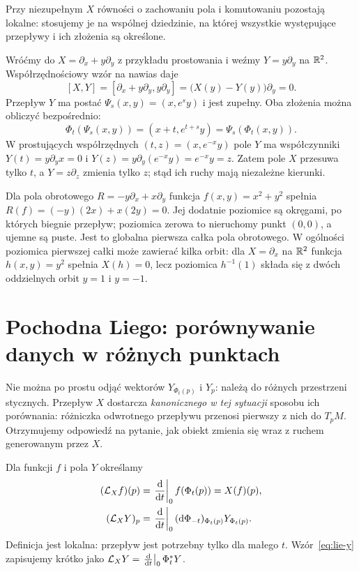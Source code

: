 Przy niezupełnym $X$ równości o zachowaniu pola i komutowaniu
pozostają lokalne: stosujemy je na wspólnej dziedzinie, na której
wszystkie występujące przepływy i ich złożenia są określone.

\begin{przyklad}
Wróćmy do $X=\partial_x+y\partial_y$ z przykładu prostowania
i weźmy $Y=y\partial_y$ na $\mathbb{R}^2$.
Współrzędnościowy wzór na nawias daje
\[
[X,Y]=[\partial_x+y\partial_y,y\partial_y]
=\bigl(X(y)-Y(y)\bigr)\partial_y=0.
\]
Przepływ $Y$ ma postać $\Psi_s(x,y)=(x,e^s y)$ i jest zupełny.
Oba złożenia można obliczyć bezpośrednio:
\[
\Phi_t(\Psi_s(x,y))=(x+t,e^{t+s}y)
=\Psi_s(\Phi_t(x,y)).
\]
W prostujących współrzędnych $(t,z)=(x,e^{-x}y)$
pole $Y$ ma współczynniki $Y(t)=y\partial_yx=0$
i $Y(z)=y\partial_y(e^{-x}y)=e^{-x}y=z$.
Zatem pole $X$ przesuwa tylko $t$, a $Y=z\partial_z$ zmienia
tylko $z$; stąd ich ruchy mają niezależne kierunki.
\end{przyklad}

\begin{przyklad}
Dla pola obrotowego $R=-y\partial_x+x\partial_y$
funkcja $f(x,y)=x^2+y^2$ spełnia
$R(f)=(-y)(2x)+x(2y)=0$.
Jej dodatnie poziomice są okręgami, po których biegnie przepływ;
poziomica zerowa to nieruchomy punkt $(0,0)$, a ujemne są puste.
Jest to globalna pierwsza całka pola obrotowego.
W ogólności poziomica pierwszej całki może zawierać kilka orbit:
dla $X=\partial_x$ na $\mathbb{R}^2$ funkcja $h(x,y)=y^2$ spełnia
$X(h)=0$, lecz poziomica $h^{-1}(1)$ składa się z dwóch
oddzielnych orbit $y=1$ i $y=-1$.
\end{przyklad}

\section{Pochodna Liego: porównywanie danych w różnych punktach}
\label{sec:liego}

Nie można po prostu odjąć wektorów $Y_{\Phi_t(p)}$ i $Y_p$:
należą do różnych przestrzeni stycznych. Przepływ $X$ dostarcza
\emph{kanonicznego w tej sytuacji} sposobu ich porównania:
różniczka odwrotnego przepływu przenosi pierwszy z nich do $T_pM$.
Otrzymujemy odpowiedź na pytanie, jak obiekt zmienia się
wraz z ruchem generowanym przez $X$.

\begin{definicja}\label{def:pochodna-liego}
Dla funkcji $f$ i pola $Y$ określamy
\begin{align}
 (\mathcal L_Xf)(p)
 &=\left.\frac{\mathrm d}{\mathrm d t}\right|_{0}f(\Phi_t(p))=X(f)(p),
 \label{eq:lie-f}\\
 (\mathcal L_XY)_p
 &=\left.\frac{\mathrm d}{\mathrm d t}\right|_{0}
 (\mathrm d\Phi_{-t})_{\Phi_t(p)}Y_{\Phi_t(p)}.
 \label{eq:lie-y}
\end{align}
Definicja jest lokalna: przepływ jest potrzebny tylko dla małego $t$.
Wzór~\eqref{eq:lie-y} zapisujemy krótko jako
$\mathcal L_XY=\left.\frac{\mathrm d}{\mathrm d t}\right|_0\Phi_t^*Y$.
\end{definicja}


